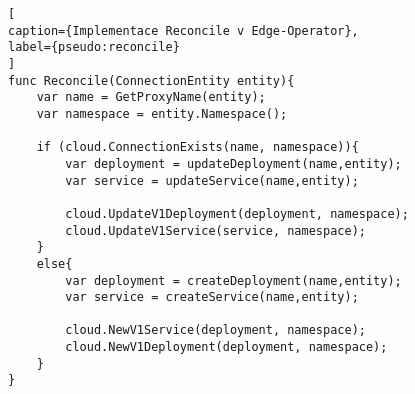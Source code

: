 \begin{lstfloat}
\begin{lstlisting}[
caption={Implementace Reconcile v Edge-Operator},
label={pseudo:reconcile}
]
func Reconcile(ConnectionEntity entity){
    var name = GetProxyName(entity);
    var namespace = entity.Namespace();

    if (cloud.ConnectionExists(name, namespace)){
        var deployment = updateDeployment(name,entity);
        var service = updateService(name,entity);

        cloud.UpdateV1Deployment(deployment, namespace);
        cloud.UpdateV1Service(service, namespace);
    }
    else{
        var deployment = createDeployment(name,entity);
        var service = createService(name,entity);

        cloud.NewV1Service(deployment, namespace);
        cloud.NewV1Deployment(deployment, namespace);
    }
}
\end{lstlisting}
\end{lstfloat}